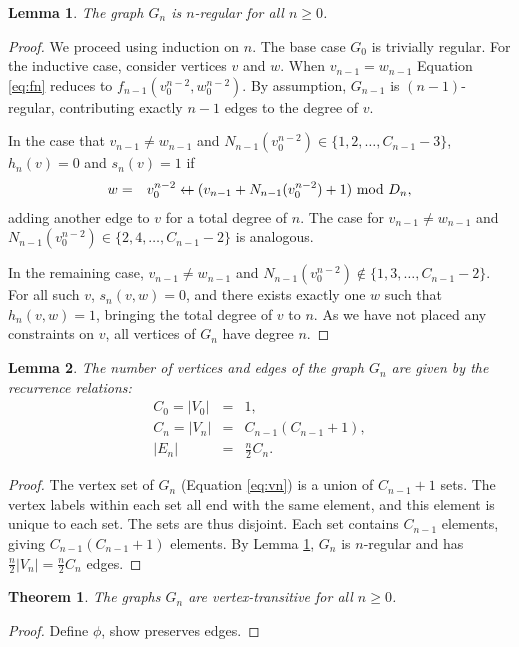 \documentclass{article}
\newcommand{\beq}{\begin{eqnarray}}
\newcommand{\eeq}{\end{eqnarray}}
\newcommand{\append}{\leftarrow{\mkern-18mu}{+}\:}
\newtheorem{lemma}{Lemma}
\newtheorem{theorem}{Theorem}
\begin{document}
\begin{lemma}
\label{lem:regular}
The graph $G_n$ is $n$-regular for all $n \geq 0$.
\end{lemma}
\begin{proof}
We proceed using induction on $n$.
The base case $G_0$ is trivially regular.
For the inductive case, consider vertices $v$ and $w$.
When $v_{n-1} = w_{n-1}$
Equation \ref{eq:fn} reduces to $f_{n-1}(v_0^{n-2},w_0^{n-2})$.
By assumption, $G_{n-1}$ is $(n-1)$-regular, contributing exactly
$n-1$ edges to the degree of $v$.

In the case that $v_{n-1} \neq w_{n-1}$ and
$N_{n-1}(v_0^{n-2}) \in \{ 1, 2, \ldots, C_{n-1} - 3\}$,
$h_n(v) = 0$ and $s_n(v) = 1$ if
\beq
w &=& v_0^{n-2} \append (v_{n-1} + N_{n-1}(v_0^{n-2}) + 1) \ \mbox{mod } D_n,
\eeq
adding another edge to $v$ for a total degree of $n$.
The case for $v_{n-1} \neq w_{n-1}$ and
$N_{n-1}(v_0^{n-2}) \in \{ 2, 4, \ldots, C_{n-1} -2 \}$ is analogous.

In the remaining case, $v_{n-1} \neq w_{n-1}$ and
$N_{n-1}(v_0^{n-2}) \not\in \{ 1, 3, \ldots, C_{n-1} - 2 \}$.
For all such $v$, $s_n(v,w) = 0$, and
there exists exactly one $w$ such that $h_n(v,w) = 1$, bringing the total
degree of $v$ to $n$.
As we have not placed any constraints on $v$, all vertices of
$G_n$ have degree $n$.
\end{proof}

\begin{lemma}
The number of vertices and edges of the graph $G_n$ are given by the recurrence
relations:
\beq
C_0 = |V_0| &=& 1, \\
\label{eq:cnrec}C_{n} = |V_{n}| &=& C_{n-1} (C_{n-1} + 1), \\
|E_n| &=& \frac{n}{2} C_n.
\eeq
\end{lemma}
\begin{proof}
The vertex set of $G_n$ (Equation \ref{eq:vn}) is a union of
$C_{n-1} + 1$ sets.
The vertex labels within each set all end with the same element,
and this element is unique to each set.
The sets are thus disjoint.
Each set contains $C_{n-1}$ elements, giving $C_{n-1}(C_{n-1} + 1)$
elements.
By Lemma \ref{lem:regular}, $G_n$ is $n$-regular and has
$\frac{n}{2}|V_n| = \frac{n}{2}C_n$ edges.
\end{proof}

\begin{theorem}
The graphs $G_n$ are vertex-transitive for all $n \geq 0$.
\end{theorem}
\begin{proof}
Define $\phi$, show preserves edges.
\end{proof}



\end{document}
